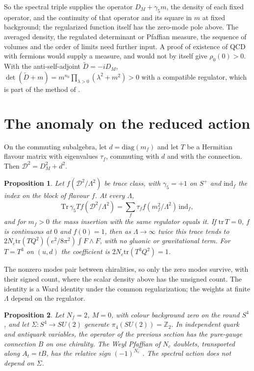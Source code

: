 \documentclass[aps,prd,reprint,onecolumn,nofootinbib,amsmath,amssymb,floatfix]{revtex4-2}
\theoremstyle{plain}
\newtheorem{proposition}{Proposition}
\begin{document}
So the spectral triple supplies the operator $D_M+\gamma_5m$, the density of each fixed operator, and the continuity of that operator and its square in $m$ at fixed background; the regularized function itself has the zero-mode pole above. The averaged density, the regulated determinant or Pfaffian measure, the sequence of volumes and the order of limits need further input. A proof of existence of QCD with fermions would supply a measure, and would not by itself give $\rho_0(0)>0$. With the anti-self-adjoint $\tilde D=-iD_M$, $\det(\tilde D+m)=m^{n_0}\prod_{\lambda>0}(\lambda^2+m^2)>0$ with a compatible regulator, which is part of the method of \cite{VW1984}.

\section{The anomaly on the reduced action}

On the commuting subalgebra, let $d=\mathrm{diag}(m_f)$ and let $T$ be a Hermitian flavour matrix with eigenvalues $\tau_f$, commuting with $d$ and with the connection. Then $\mathcal D^2=D_M^2+d^2$.

\begin{proposition}
Let $f(\mathcal D^2/\Lambda^2)$ be trace class, with $\gamma_5=+1$ on $S^+$ and $\mathrm{ind}_f$ the index on the block of flavour $f$. At every $\Lambda$,
\begin{equation}
\mathrm{Tr}\,\gamma_5Tf(\mathcal D^2/\Lambda^2)=\sum_f\tau_ff(m_f^2/\Lambda^2)\,\mathrm{ind}_f,
\end{equation}
and for $m_f>0$ the mass insertion with the same regulator equals it. If $\mathrm{tr}\,T=0$, $f$ is continuous at $0$ and $f(0)=1$, then as $\Lambda\to\infty$ twice this trace tends to $2N_c\mathrm{tr}(TQ^2)(e^2/8\pi^2)\int F\wedge F$, with no gluonic or gravitational term. For $T=T^3$ on $(u,d)$ the coefficient is $2N_c\mathrm{tr}(T^3Q^2)=1$.
\end{proposition}

The nonzero modes pair between chiralities, so only the zero modes survive, with their signed count, where the scalar density above has the unsigned count. The identity is a Ward identity under the common regularization; the weights at finite $\Lambda$ depend on the regulator.

\begin{proposition}
Let $N_f=2$, $M=0$, with colour background zero on the round $S^4$, and let $\Sigma:S^4\to SU(2)$ generate $\pi_4(SU(2))=\mathbb Z_2$. In independent quark and antiquark variables, the operator of the previous section has the pure-gauge connection $B$ on one chirality. The Weyl Pfaffian of $N_c$ doublets, transported along $A_t=tB$, has the relative sign $(-1)^{N_c}$ \cite{Witten1982}. The spectral action does not depend on $\Sigma$.
\end{proposition}
\end{document}

